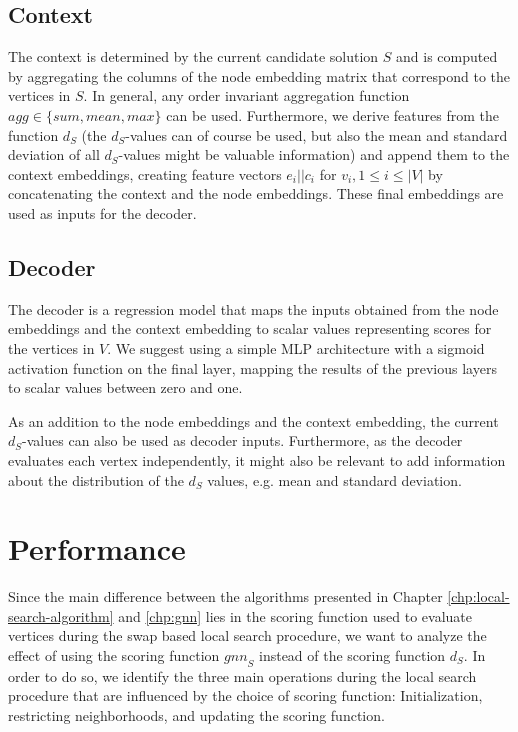 \documentclass[draft,final]{vutinfth} %
\begin{document}
\subsection{Context}
The context is determined by the current candidate solution $S$ and is computed by aggregating the columns of the node embedding matrix that correspond to the vertices in $S$. In general, any order invariant aggregation function $\mathit{agg} \in \{\mathit{sum, mean, max}\}$ can be used. Furthermore, we derive features from the function $d_S$ (the $d_S$-values can of course be used, but also the mean and standard deviation of all $d_S$-values might be valuable information) and append them to the context embeddings, creating feature vectors $e_i ||c_i$ for $v_i, 1 \leq i \leq |V|$ by concatenating the context and the node embeddings. These final embeddings are used as inputs for the decoder. 

\subsection{Decoder}
The decoder is a regression model that maps the inputs obtained from the node embeddings and the context embedding to scalar values representing scores for the vertices in $V$. We suggest using a simple MLP architecture with a sigmoid activation function on the final layer, mapping the results of the previous layers to scalar values between zero and one. 

As an addition to the node embeddings and the context embedding, the current $d_S$-values can also be used as decoder inputs. Furthermore, as the decoder evaluates each vertex independently, it might also be relevant to add information about the distribution of the $d_S$ values, e.g. mean and standard deviation. 

\section{Performance}\label{sec:performance}

Since the main difference between the algorithms presented in Chapter \ref{chp:local-search-algorithm} and \ref{chp:gnn} lies in the scoring function used to evaluate vertices during the swap based local search procedure, we want to analyze the effect of using the scoring function $\mathit{gnn}_S$ instead of the scoring function $d_S$. 
In order to do so, we identify the three main operations during the local search procedure that are influenced by the choice of scoring function: Initialization, restricting neighborhoods, and updating the scoring function.  
\end{document}
